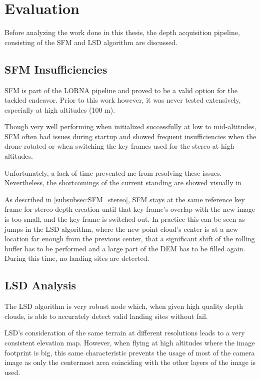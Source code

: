 \chapter{Evaluation}
\label{chapter:evaluation}

Before analyzing the work done in this thesis, the depth acquisition pipeline, consisting of the SFM and LSD algorithm are discussed.

\section{SFM Insufficiencies}\label{subsec:sfm_insufficiencies}
SFM is part of the LORNA pipeline and proved to be a valid option for the tackled endeavor. Prior to this work however, it was never tested extensively, especially at high altitudes (100 m).

Though very well performing when initialized successfully at low to mid-altitudes, SFM often had issues during startup and showed frequent insufficiencies when the drone rotated or when switching the key frames used for the stereo at high altitudes.

Unfortunately, a lack of time prevented me from resolving these issues. Nevertheless, the shortcomings of the current standing are showed visually in %

As described in \cref{subsubsec:SFM_stereo}, SFM stays at the same reference key frame for stereo depth creation until that key frame's overlap with the new image is too small, and the key frame is switched out. In practice this can be seen as jumps in the LSD algorithm, where the new point cloud's center is at a new location far enough from the previous center, that a significant shift of the rolling buffer has to be performed and a large part of the DEM has to be filled again. During this time, no landing sites are detected.%

\section{LSD Analysis}\label{sec:eval_LSD}

The LSD algorithm is very robust node which, when given high quality depth clouds, is able to accurately detect valid landing sites without fail.

LSD's consideration of the same terrain at different resolutions leads to a very consistent elevation map. However, when flying at high altitudes where the image footprint is big, this same characteristic prevents the usage of most of the camera image as only the centermost area coinciding with the other layers of the image is used. %

